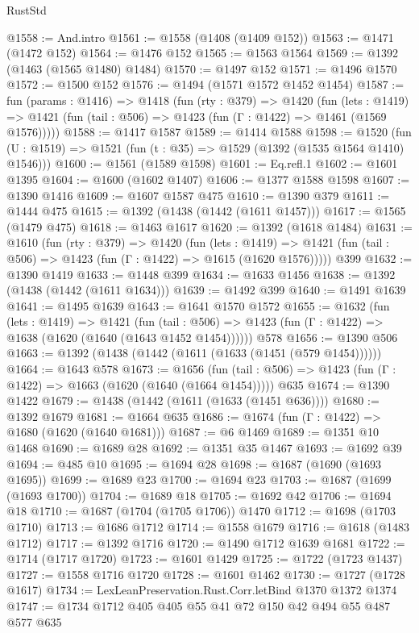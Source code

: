 \begin{lexlean}{RustStd}
\begin{coremodule}
@1558 := And.intro
@1561 := @1558 (@1408 (@1409 @152))
@1563 := @1471 (@1472 @152)
@1564 := @1476 @152
@1565 := @1563 @1564
@1569 := @1392 (@1463 (@1565 @1480) @1484)
@1570 := @1497 @152
@1571 := @1496 @1570
@1572 := @1500 @152
@1576 := @1494 (@1571 @1572 @1452 @1454)
@1587 := fun (params : @1416) =>
  @1418
    (fun (rty : @379) =>
    @1420
      (fun (lets : @1419) =>
      @1421 (fun (tail : @506) => @1423 (fun (Γ : @1422) => @1461 (@1569 @1576)))))
@1588 := @1417 @1587
@1589 := @1414 @1588
@1598 := @1520 (fun (U : @1519) => @1521 (fun (t : @35) => @1529 (@1392 (@1535 @1564 @1410) @1546)))
@1600 := @1561 (@1589 @1598)
@1601 := Eq.refl.{1}
@1602 := @1601 @1395
@1604 := @1600 (@1602 @1407)
@1606 := @1377 @1588 @1598
@1607 := @1390 @1416
@1609 := @1607 @1587 @475
@1610 := @1390 @379
@1611 := @1444 @475
@1615 := @1392 (@1438 (@1442 (@1611 @1457)))
@1617 := @1565 (@1479 @475)
@1618 := @1463 @1617
@1620 := @1392 (@1618 @1484)
@1631 := @1610
    (fun (rty : @379) =>
    @1420
      (fun (lets : @1419) =>
      @1421 (fun (tail : @506) => @1423 (fun (Γ : @1422) => @1615 (@1620 @1576)))))
    @399
@1632 := @1390 @1419
@1633 := @1448 @399
@1634 := @1633 @1456
@1638 := @1392 (@1438 (@1442 (@1611 @1634)))
@1639 := @1492 @399
@1640 := @1491 @1639
@1641 := @1495 @1639
@1643 := @1641 @1570 @1572
@1655 := @1632
    (fun (lets : @1419) =>
    @1421
      (fun (tail : @506) => @1423 (fun (Γ : @1422) => @1638 (@1620 (@1640 (@1643 @1452 @1454))))))
    @578
@1656 := @1390 @506
@1663 := @1392 (@1438 (@1442 (@1611 (@1633 (@1451 (@579 @1454))))))
@1664 := @1643 @578
@1673 := @1656
    (fun (tail : @506) => @1423 (fun (Γ : @1422) => @1663 (@1620 (@1640 (@1664 @1454)))))
    @635
@1674 := @1390 @1422
@1679 := @1438 (@1442 (@1611 (@1633 (@1451 @636))))
@1680 := @1392 @1679
@1681 := @1664 @635
@1686 := @1674 (fun (Γ : @1422) => @1680 (@1620 (@1640 @1681)))
@1687 := @6 @1469
@1689 := @1351 @10 @1468
@1690 := @1689 @28
@1692 := @1351 @35 @1467
@1693 := @1692 @39
@1694 := @485 @10
@1695 := @1694 @28
@1698 := @1687 (@1690 (@1693 @1695))
@1699 := @1689 @23
@1700 := @1694 @23
@1703 := @1687 (@1699 (@1693 @1700))
@1704 := @1689 @18
@1705 := @1692 @42
@1706 := @1694 @18
@1710 := @1687 (@1704 (@1705 @1706)) @1470
@1712 := @1698 (@1703 @1710)
@1713 := @1686 @1712
@1714 := @1558 @1679
@1716 := @1618 (@1483 @1712)
@1717 := @1392 @1716
@1720 := @1490 @1712 @1639 @1681
@1722 := @1714 (@1717 @1720)
@1723 := @1601 @1429
@1725 := @1722 (@1723 @1437)
@1727 := @1558 @1716 @1720
@1728 := @1601 @1462
@1730 := @1727 (@1728 @1617)
@1734 := LexLeanPreservation.Rust.Corr.letBind @1370 @1372 @1374
@1747 := @1734 @1712 @405 @405 @55 @41 @72 @150 @42 @494 @55 @487 @577 @635

\end{coremodule}
\end{lexlean}
